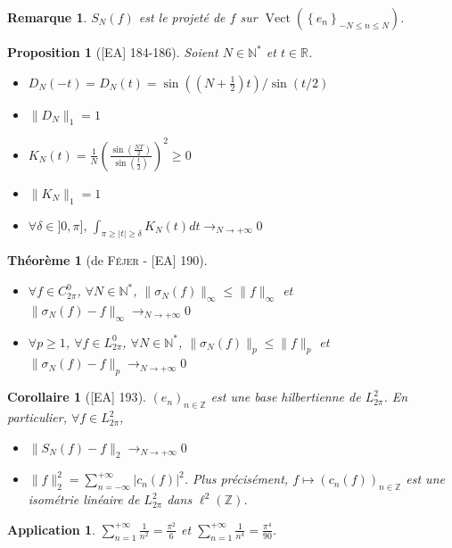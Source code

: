 \documentclass[10pt, a4paper, parskip=full, twoside, twocolumn]{report}
\newtheorem{theorem}[definition]{Théorème}
\newtheorem{proposition}[definition]{Proposition}
\newtheorem{corollary}[definition]{Corollaire}
\newtheorem{remark}[definition]{Remarque}
\newtheorem{application}[definition]{Application}
\newcommand{\IN}{\mathbb{N}}
\newcommand{\IZ}{\mathbb{Z}}
\newcommand{\IR}{\mathbb{R}}
\DeclareMathOperator{\Vect}{Vect}
\begin{document}
\begin{remark}
	$S_N(f)$ est le projeté de $f$ sur $\Vect\left(\left\{e_n\right\}_{-N\leq n\leq N}\right)$.
\end{remark}

\begin{proposition}[\textnormal{[EA] 184-186}]
	Soient $N\in \IN^*$ et $t\in \IR$.
	\begin{itemize}
		\item $D_N(-t) = D_N(t)=\sin\left((N+\frac{1}{2})t\right) / \sin(t/2)$
		\item $\|D_N\|_1 = 1$
		\item $K_N(t) = \frac{1}{N}\left(\frac{\sin(\frac{NT}{2})}{\sin(\frac{t}{2})}\right)^2\geq 0$
		\item $\|K_N\|_1 = 1$
		\item $\forall \delta\in ]0,\pi],\, \int_{\pi \geq \vert t \vert \geq \delta}K_N(t)dt \longrightarrow_{N\to +\infty} 0$
	\end{itemize}
\end{proposition}

\begin{theorem}[de \textsc{Féjer} - \textnormal{[EA] 190}]
	\begin{itemize}
		\item $\forall f\in C^0_{2\pi}$, $\forall N\in \IN^*$, $\|\sigma_N(f)\|_{\infty}\leq \|f\|_{\infty}$ et $\|\sigma_N(f) - f\|_{\infty} \longrightarrow_{N\to +\infty} 0$
		\item $\forall p \geq 1$, $\forall f\in L^0_{2\pi}$, $\forall N\in \IN^*$, $\|\sigma_N(f)\|_{p}\leq \|f\|_{p}$ et $\|\sigma_N(f) - f\|_{p} \longrightarrow_{N\to +\infty} 0$
	\end{itemize}	
\end{theorem}

\begin{corollary}[\textnormal{[EA] 193}]
	$\left(e_n\right)_{n\in\IZ}$ est une base hilbertienne de $L^2_{2\pi}$. En particulier, $\forall f\in L^2_{2\pi}$, 
	\begin{itemize}
		\item $\|S_N(f)-f\|_2 \longrightarrow_{N\to +\infty} 0$
		\item $\|f\|^2_2 = \sum_{n=-\infty}^{+\infty} \vert c_n(f) \vert^2$. Plus précisément, $f\mapsto \left(c_n(f)\right)_{n\in\IZ}$ est une isométrie linéaire de $L^2_{2\pi}$ dans $\ell^2(\IZ)$.
	\end{itemize}
\end{corollary}

\begin{application}
	$\sum_{n=1}^{+\infty} \frac{1}{n^2} = \frac{\pi^2}{6}$ et $\sum_{n=1}^{+\infty} \frac{1}{n^4} = \frac{\pi^4}{90}$.
\end{application}
\end{document}
